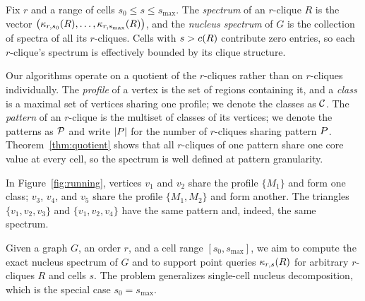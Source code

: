 Fix $r$ and a range of cells $s_0\le s\le s_{\max}$.
%
The \textit{spectrum} of an $r$-clique $R$ is the vector $\big(\kappa_{r,s_0}(R),\dots,\kappa_{r,s_{\max}}(R)\big)$, and the \textit{nucleus spectrum} of $G$ is the collection of spectra of all its $r$-cliques.
%
Cells with $s>c(R)$ contribute zero entries, so each $r$-clique's spectrum is effectively bounded by its clique structure.

Our algorithms operate on a quotient of the $r$-cliques rather than on $r$-cliques individually.
%
The \textit{profile} of a vertex is the set of regions containing it, and a \textit{class} is a maximal set of vertices sharing one profile; we denote the classes as $\mathcal{C}$.
%
The \textit{pattern} of an $r$-clique is the multiset of classes of its vertices; we denote the patterns as $\mathcal{P}$ and write $|P|$ for the number of $r$-cliques sharing pattern $P$.
%
Theorem~\ref{thm:quotient} shows that all $r$-cliques of one pattern share one core value at every cell, so the spectrum is well defined at pattern granularity.

\begin{example}
\label{exa:pattern}
In Figure~\ref{fig:running}, vertices $v_1$ and $v_2$ share the profile $\{M_1\}$ and form one class; $v_3$, $v_4$, and $v_5$ share the profile $\{M_1,M_2\}$ and form another.
%
The triangles $\{v_1,v_2,v_3\}$ and $\{v_1,v_2,v_4\}$ have the same pattern and, indeed, the same spectrum.
\end{example}

Given a graph $G$, an order $r$, and a cell range $[s_0,s_{\max}]$, we aim to compute the exact nucleus spectrum of $G$ and to support point queries $\kappa_{r,s}(R)$ for arbitrary $r$-cliques $R$ and cells $s$.
%
The problem generalizes single-cell nucleus decomposition, which is the special case $s_0=s_{\max}$.
